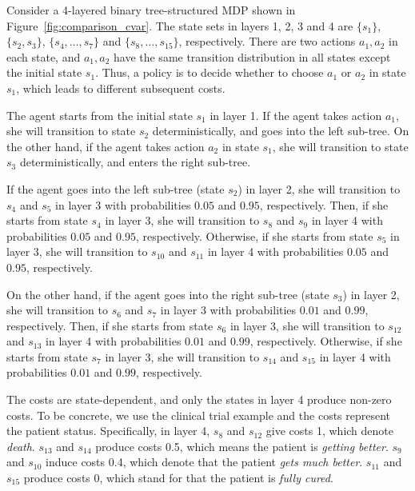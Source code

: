 {	
	Consider a 4-layered binary tree-structured MDP shown in Figure~\ref{fig:comparison_cvar}. The state sets in layers 1, 2, 3 and 4 are $\{s_1\}$, $\{s_2,s_3\}$, $\{s_4,\dots,s_7\}$ and $\{s_8,\dots,s_{15}\}$,  respectively. There are two actions $a_1,a_2$ in each state, and $a_1,a_2$ have the same transition distribution in all states except the initial state $s_1$. Thus, a policy is to decide whether to choose $a_1$ or $a_2$ in state $s_1$, which leads to different subsequent costs. 
	
	
	The agent starts from the initial state $s_1$ in layer 1. 
	If the agent takes action $a_1$, she will transition to state $s_2$ deterministically, and goes into the left sub-tree. On the other hand, if the agent takes action $a_2$ in state $s_1$, she will transition to state $s_3$ deterministically, and enters the right sub-tree.
	
	If the agent goes into the left sub-tree (state $s_2$) in layer 2, she will transition to $s_4$ and $s_5$ in layer 3 with probabilities $0.05$ and $0.95$, respectively. 
	Then, if she starts from state $s_4$ in layer 3, she will transition to $s_8$ and $s_9$ in layer 4 with probabilities $0.05$ and $0.95$, respectively. 
	Otherwise, if she starts from state $s_5$ in layer 3, she will transition to $s_{10}$ and $s_{11}$ in layer 4 with probabilities $0.05$ and $0.95$, respectively.
	
	On the other hand, if the agent goes into the right sub-tree (state $s_3$) in layer 2, she will transition to $s_6$ and $s_7$ in layer 3 with probabilities $0.01$ and $0.99$, respectively. 
	Then, if she starts from state $s_6$ in layer 3, she will transition to $s_{12}$ and $s_{13}$ in layer 4 with probabilities $0.01$ and $0.99$, respectively. 
	Otherwise, if she starts from state $s_7$ in layer 3, she will transition to $s_{14}$ and $s_{15}$ in layer 4 with probabilities $0.01$ and $0.99$, respectively.
	
	
	The costs are state-dependent, and only the states in layer 4 produce non-zero costs. To be concrete, we use the clinical trial example and the costs represent the patient status. Specifically, in layer 4, $s_8$ and $s_{12}$ give costs 1, which denote \emph{death}. $s_{13}$ and $s_{14}$ produce costs 0.5, which means the patient is \emph{getting better}. $s_9$ and $s_{10}$ induce costs 0.4, which denote that the patient \emph{gets much better}. $s_{11}$ and $s_{15}$ produce costs 0, which stand for that the patient is \emph{fully cured}.
	
}
